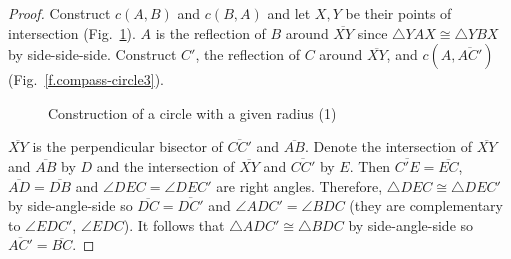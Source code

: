 \begin{proof}
Construct $c(A,B)$ and $c(B,A)$ and let $X,Y$ be their points of intersection (Fig.~\ref{f.compass-circle1}). $A$ is the reflection of $B$ around $\overline{XY}$ since $\triangle YAX\cong \triangle YBX$ by side-side-side.
Construct $C'$, the reflection of $C$ around $\overline{XY}$, and $c(A,\overline{AC'})$ (Fig.~\ref{f.compass-circle3}).

\begin{figure}[b]
\begin{center}
\end{center}
\caption{Construction of  a circle with a given radius (1)}\label{f.compass-circle1}
\end{figure}

$\overline{XY}$ is the perpendicular bisector of $\overline{CC'}$ and $\overline{AB}$. Denote the intersection of $\overline{XY}$ and $\overline{AB}$ by $D$ and the intersection of $\overline{XY}$ and $\overline{CC'}$ by $E$. Then $\overline{C'E}=\overline{EC}$, $\overline{AD}=\overline{DB}$ and $\angle DEC=\angle DEC'$ are right angles. Therefore, $\triangle DEC\cong\triangle DEC'$ by side-angle-side so $\overline{DC}=\overline{DC'}$ and $\angle ADC'=\angle BDC$ (they are complementary to $\angle EDC'$, $\angle EDC$). It follows that $\triangle ADC'\cong\triangle BDC$ by side-angle-side so $\overline{AC'}=\overline{BC}$.
\end{proof}


